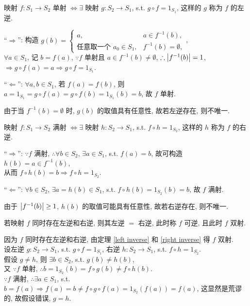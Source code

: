 \documentclass{note}
\begin{document}
\begin{thm}\label{left inverse}
    映射 $f:S_1\rightarrow S_2$ 单射 $\Longleftrightarrow\exists$ 映射 $g:S_2\rightarrow S_1$, s.t. $g\circ f=1_{S_1}$, 这样的 $g$ 称为 $f$ 的左逆.
\end{thm}
\begin{pf}
    ``$\Longrightarrow$'': 构造 $g(b)=\left\{\begin{array}{ll}
        a,&a\in f^{-1}(b),\\
        \text{任意取一个 }a_0\in S_1,&f^{-1}(b)=\emptyset,
    \end{array}\right.$,\\
    $\forall a\in S_1$, 记 $b=f(a)$, $\because f$ 单射且 $a\in f^{-1}(b)\neq\emptyset$, $\therefore\left\lvert f^{-1}(b)\right\rvert=1$,\\
    $\Longrightarrow g\circ f(a)=a\Longrightarrow g\circ f=1_{S_1}$.

    ``$\Longleftarrow$'': $\forall a,b\in S_1$, 若 $f(a)=f(b)$, 则 $a=1_{S_1}=g\circ f(a)=g\circ f(b)=1_{S_1}(b)=b$, 故 $f$ 单射.
\end{pf}

由于当 $f^{-1}(b)=\emptyset$ 时, $g(b)$ 的取值具有任意性, 故若左逆存在, 则不唯一.

\begin{thm}\label{right inverse}
    映射 $f:S_1\rightarrow S_2$ 满射 $\Longleftrightarrow\exists$ 映射 $h:S_2\rightarrow S_1$, s.t. $f\circ h=1_{S_2}$, 这样的 $h$ 称为 $f$ 的右逆.
\end{thm}
\begin{pf}
    ``$\Longrightarrow$'': $\because f$ 满射, $\therefore\forall b\in S_2$, $\exists a\in S_1$, s.t. $f(a)=b$, 故可构造 $h(b)=a\in f^{-1}(b)$,\\
    从而 $f\circ h(b)=b\Longrightarrow f\circ h=1_{S_2}$.

    ``$\Longleftarrow$'': $\forall b\in S_2$, $\exists a=h(b)\in S_1$, s.t. $f\circ h(b)=1_{S_2}(b)=b$, 故 $f$ 满射.
\end{pf}

由于 $\left\lvert f^{-1}(b)\right\rvert\geq 1$, $h(b)$ 的取值可能具有任意性, 故若右逆存在, 则不唯一.

\begin{thm}
    若映射 $f$ 同时存在左逆和右逆, 则其左逆 $=$ 右逆, 此时称 $f$ 可逆, 且此时 $f$ 双射.
\end{thm}
\begin{pf}
    因为 $f$ 同时存在左逆和右逆, 由定理 \ref{left inverse} 和 \ref{right inverse} 得 $f$ 双射.\\
    设左逆 $g:S_2\rightarrow S_1$, s.t. $g\circ f=1_{S_1}$, 右逆 $h:S_2\rightarrow S_1$, s.t. $f\circ h=1_{S_2}$.\\
    假设 $g\neq h$, 则 $\exists b\in S_2$, s.t. $g(b)\neq h(b)$,\\
    又 $\because f$ 单射, $\therefore b=1_{S_2}(b)=f\circ g(b)\neq f\circ h(b)$.\\
    $\because f$ 满射, $\therefore\exists a\in S_1$, s.t. $b=f(a)\Longrightarrow f(a)=b\neq f\circ g\circ f(a)=1_{S_2}(f(a))=f(a)$, 这显然是荒谬的, 故假设错误, $g=h$.
\end{pf}
\end{document}
